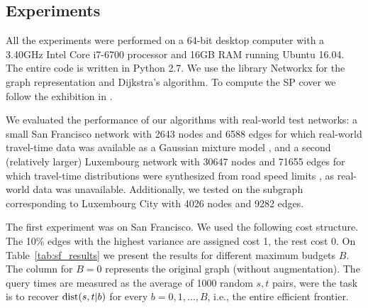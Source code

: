 \subsection{Experiments}

All the experiments were performed on a 64-bit desktop computer with a 3.40GHz Intel Core i7-6700 processor and 16GB RAM running Ubuntu 16.04.
The entire code is written in Python 2.7. We use the library Networkx for the graph representation and Dijkstra's algorithm.
To compute the SP cover we follow the exhibition in \cite{hubimplem}.

We evaluated the performance of our algorithms with real-world test networks: a small San Francisco network with 2643 nodes and 6588 edges for which real-world travel-time data was available as a Gaussian mixture model \cite{sf_data}, and a second (relatively larger) Luxembourg network with 30647 nodes and 71655 edges for which travel-time distributions were synthesized from road speed limits \cite{niknami2016tractable}, as real-world data was unavailable.
Additionally, we tested on the subgraph corresponding to Luxembourg City with 4026 nodes and 9282 edges.

The first experiment was on San Francisco.
We used the following cost structure.
The 10\% edges with the highest variance are assigned cost 1, the rest cost 0.
On Table~\ref{tab:sf_results} we present the results for different maximum budgets $B$.
The column for $B=0$ represents the original graph (without augmentation).
The query times are measured as the average of 1000 random $s,t$ pairs, were the task is to recover $\text{dist}(s,t|b)$ for every $b=0,1,\ldots,B$, i.e., the entire efficient frontier.

